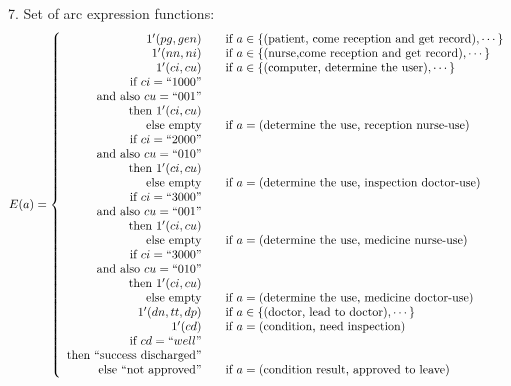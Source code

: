 \documentclass{article}
\begin{document}
7. Set of arc expression functions:
$$ E(a)=\left\{
\begin{array}{rcl}
1^{\prime}(pg,gen)  &      & \mbox{if}\ a \in \{(\mbox{patient, come reception and get record}),\cdots\}\\
1^{\prime}(nn,ni)  &      & \mbox{if}\ a \in \{(\mbox{nurse,come reception and get record}),\cdots\}\\
1^{\prime}(ci,cu)  &      & \mbox{if}\ a \in \{(\mbox{computer, determine the user}),\cdots\}\\
\mbox{if} \ ci=``1000"\\ \mbox{and\ also}\ cu=``001"  \\ \mbox{then}\ 1^{\prime}(ci,cu) \\ \mbox{else\ empty} &      & \mbox{if}\ a = (\mbox{determine the use, reception nurse-use}) \\
\mbox{if} \ ci=``2000"\\ \mbox{and\ also}\ cu=``010"  \\ \mbox{then}\ 1^{\prime}(ci,cu) \\ \mbox{else\ empty} &      & \mbox{if}\ a = (\mbox{determine the use, inspection doctor-use}) \\
\mbox{if} \ ci=``3000"\\ \mbox{and\ also}\ cu=``001"  \\ \mbox{then}\ 1^{\prime}(ci,cu) \\ \mbox{else\ empty} &      & \mbox{if}\ a = (\mbox{determine the use, medicine nurse-use}) \\
\mbox{if} \ ci=``3000"\\ \mbox{and\ also}\ cu=``010"  \\ \mbox{then}\ 1^{\prime}(ci,cu) \\ \mbox{else\ empty} &      & \mbox{if}\ a = (\mbox{determine the use, medicine doctor-use}) \\
1^{\prime}(dn,tt,dp)  &      & \mbox{if}\ a \in \{(\mbox{doctor, lead to doctor}),\cdots\}\\
1^{\prime}(cd)  &      & \mbox{if}\ a = (\mbox{condition, need inspection})\\
\mbox{if} \ cd=``well"\\ \mbox{then ``success discharged''} \\ \mbox{else ``not approved''} &      & \mbox{if}\ a = (\mbox{condition result, approved to leave})
\end{array} \right. $$
\end{document}
